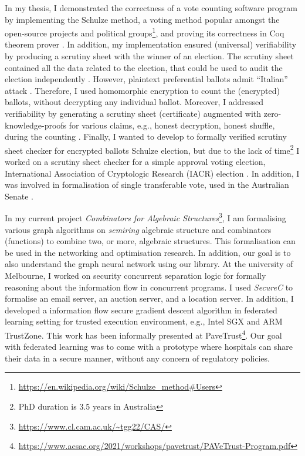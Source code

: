 \documentclass[a4paper]{article}
\begin{document}
In my thesis, I demonstrated the correctness of a vote counting software program 
by implementing the Schulze method, a voting method popular amongst the open-source projects and 
political groups\footnote{\url{https://en.wikipedia.org/wiki/Schulze_method#Users}}, and proving its correctness in Coq theorem 
prover \cite{10.1007/978-3-319-66107-0_26}. In addition, my implementation 
ensured (universal) verifiability by producing a scrutiny sheet 
with the winner of an election. The scrutiny sheet contained all the data related 
to the election, that could be used to audit the election independently \cite{bennett2017no}.
However, plaintext preferential ballots admit ``Italian'' attack \cite{Otten, Benaloh:2009:SSC}. 
Therefore, I used homomorphic encryption to count the (encrypted) ballots, without decrypting 
any individual ballot. Moreover, I addressed verifiability by generating a scrutiny sheet (certificate) 
augmented with zero-knowledge-proofs for various claims, e.g., honest decryption, honest shuffle,  
during the counting \cite{10.1007/978-3-030-41600-3_4}. Finally, I wanted to develop to formally 
verified scrutiny sheet checker for encrypted ballots Schulze election, but due to the lack of 
time\footnote{PhD duration is 3.5 years in Australia} I worked on a scrutiny sheet checker for a simple approval voting election,
International Association of Cryptologic Research (IACR) election \cite{10.1145/3319535.3354247}.
In addition, I was involved in formalisation of single transferable vote, used in the Australian Senate
\cite{10.1007/978-3-030-00419-4_4}.


In my current project \emph{Combinators for Algebraic Structures}\footnote{\url{https://www.cl.cam.ac.uk/~tgg22/CAS/}}, 
I am formalising various graph algorithms on \emph{semiring} algebraic 
structure and combinators (functions) to 
combine two, or more, algebraic structures. This formalisation 
can be used in the networking and optimisation research. In addition, 
our goal is to also understand the graph neural network using our library.
At the university of Melbourne, I worked on 
security concurrent separation logic for formally reasoning about the information flow in concurrent programs. 
I used \textit{SecureC} to formalise an email server, 
an auction server, and a location server. 
In addition, I developed a information flow secure gradient descent algorithm in federated 
learning setting for 
trusted execution environment, e.g., Intel SGX and ARM TrustZone. This work has been 
informally presented at 
PaveTrust\footnote{\url{https://www.acsac.org/2021/workshops/pavetrust/PAVeTrust-Program.pdf}}.
Our goal with federated learning was to come with a prototype 
where hospitals can share their data in a secure manner,
without any concern of regulatory policies.
\end{document}
